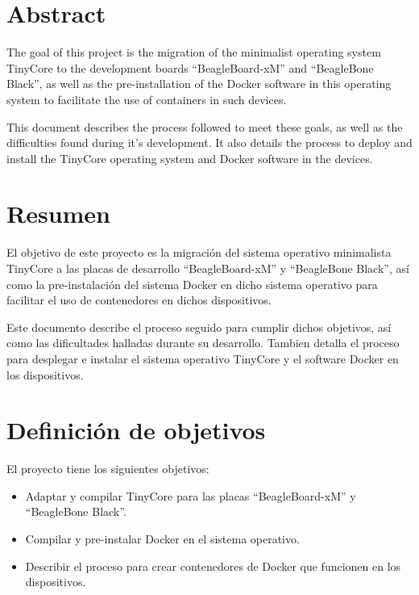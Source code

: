 \documentclass{tfg}
\begin{document}
\tfgmaketitle
\cleardoublepage

\chapter*{Abstract}
The goal of this project is the migration of the minimalist operating system TinyCore to the development boards
``BeagleBoard-xM'' and ``BeagleBone Black'', as well as the pre-installation of the Docker software in this operating system
to facilitate the use of containers in such devices.
\\\par
This document describes the process followed to meet these goals, as well as the difficulties found during it's development. It also
details the process to deploy and install the TinyCore operating system and Docker software in the devices.

\chapter*{Resumen}
El objetivo de este proyecto es la migración del sistema operativo minimalista TinyCore a las placas de desarrollo
``BeagleBoard-xM'' y ``BeagleBone Black'', así como la pre-instalación del sistema Docker en dicho sistema operativo
para facilitar el uso de contenedores en dichos dispositivos.
\\\par
Este documento describe el proceso seguido para cumplir dichos objetivos, así como las dificultades halladas durante su desarrollo.
Tambien detalla el proceso para desplegar e instalar el sistema operativo TinyCore y el software Docker en los dispositivos.

\tableofcontents
\lstlistoflistings
\listoffigures

\cleardoublepage
{}

\chapter{Definición de objetivos}
El proyecto tiene los siguientes objetivos:
\begin{itemize}
	\item Adaptar y compilar TinyCore para las placas ``BeagleBoard-xM'' y ``BeagleBone Black''.
	\item Compilar y pre-instalar Docker en el sistema operativo.
	\item Describir el proceso para crear contenedores de Docker que funcionen en los dispositivos.
\end{itemize}
\end{document}

